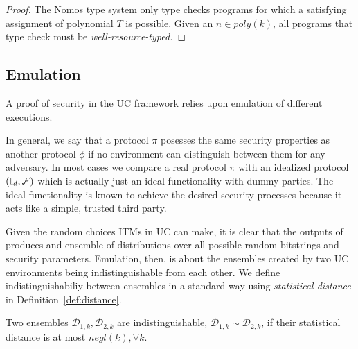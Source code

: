\begin{proof}
The Nomos type system only type checks programs for which a satisfying assignment of polynomial $T$ is possible.
Given an $n \in poly(k)$, all programs that type check must be \textit{well-resource-typed.}
\end{proof}

\subsection{Emulation}
A proof of security in the UC framework relies upon emulation of different executions.

In general, we say that a protocol $\pi$ posesses the same security properties as another protocol $\phi$ if no environment can distinguish between them for any adversary.
In most cases we compare a real protocol $\pi$ with an idealized protocol $(\mathbb{I}_d, \mathcal{F})$ which is actually just an ideal functionality with dummy parties.
The ideal functionality is known to achieve the desired security processes because it acts like a simple, trusted third party.

Given the random choices ITMs in UC can make, it is clear that the outputs of  produces and ensemble of distributions over all possible random bitstrings and security parameters.
Emulation, then, is about the ensembles created by two UC environments being indistinguishable from each other.
We define indistinguishabiliy between ensembles in a standard way using \textit{statistical distance} in Definition~\ref{def:distance}.

\begin{definition}[Indisinguishability]\label{def:distance}
Two ensembles $\mathcal{D}_{1,k}, \mathcal{D}_{2,k}$ are indistinguishable, $\mathcal{D}_{1,k} \sim \mathcal{D}_{2,k}$, if their statistical distance is at most $negl(k), \forall k$.
\end{definition}

